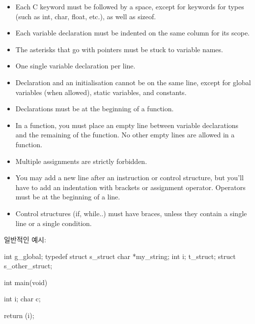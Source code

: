 \documentclass{42-ko}
\begin{document}
\begin{itemize}
                \item Each C keyword must be followed by a space, except for
                  keywords for types (such as int, char, float, etc.),
                  as well as sizeof.

                \item Each variable declaration must be indented on the same
                  column for its scope.

                \item The asterisks that go with pointers must be stuck to
                  variable names.

                \item One single variable declaration per line.

                \item Declaration and an initialisation cannot be
                  on the same line, except for global variables (when allowed),
                  static variables, and constants.

                \item Declarations must be at the beginning of a function.

                \item In a function, you must place an empty line between 
                    variable declarations and the remaining of the function.
                    No other empty lines are allowed in a function.

                \item Multiple assignments are strictly forbidden.

                \item You may add a new line after an instruction or
                  control structure, but you'll have to add an
                  indentation with brackets or assignment operator.
                  Operators must be at the beginning of a line.

                \item Control structures (if, while..) must have braces, unless they contain a single 
                    line or a single condition.

            \end{itemize}

            \newpage

            일반적인 예시:
            \begin{42ccode}
int             g_global;
typedef struct  s_struct
{
    char    *my_string;
    int     i;
}               t_struct;
struct          s_other_struct;

int     main(void)
{
    int     i;
    char    c;

    return (i);
}
            \end{42ccode}
            \newpage
\end{document}
